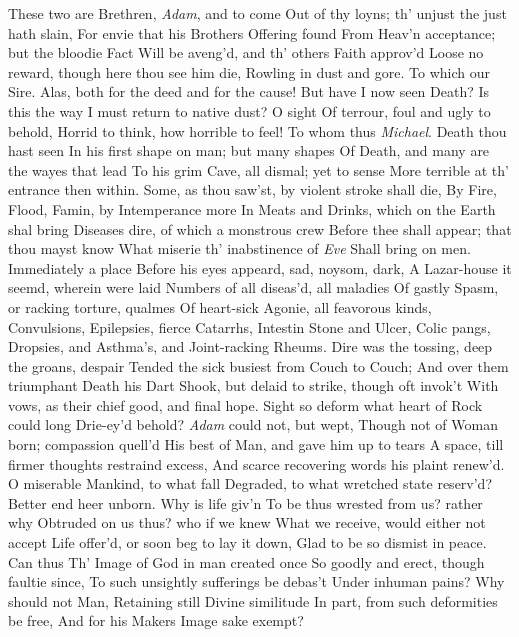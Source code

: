 \documentclass[11pt]{book}
\newcounter {first}
\begin{document}
These two are Brethren, \textit{Adam}, and to come 
Out of thy loyns; th' unjust the just hath slain, 
For envie that his Brothers Offering found 
From Heav'n acceptance; but the bloodie Fact 
Will be aveng'd, and th' others Faith approv'd 
Loose no reward, though here thou see him die, 
Rowling in dust and gore.  To which our Sire. 
\quad Alas, both for the deed and for the cause! 
But have I now seen Death?  Is this the way 
I must return to native dust?  O sight 
Of terrour, foul and ugly to behold, 
Horrid to think, how horrible to feel! 
\quad To whom thus \textit{Michael}.  Death thou hast seen 
In his first shape on man; but many shapes 
Of Death, and many are the wayes that lead 
To his grim Cave, all dismal; yet to sense 
More terrible at th' entrance then within. 
Some, as thou saw'st, by violent stroke shall die, 
By Fire, Flood, Famin, by Intemperance more 
In Meats and Drinks, which on the Earth shal bring 
Diseases dire, of which a monstrous crew 
Before thee shall appear; that thou mayst know 
What miserie th' inabstinence of \textit{Eve} 
Shall bring on men.  Immediately a place 
Before his eyes appeard, sad, noysom, dark, 
A Lazar-house it seemd, wherein were laid 
Numbers of all diseas'd, all maladies 
Of gastly Spasm, or racking torture, qualmes 
Of heart-sick Agonie, all feavorous kinds, 
Convulsions, Epilepsies, fierce Catarrhs, 
Intestin Stone and Ulcer, Colic pangs, 
Dropsies, and Asthma's, and Joint-racking Rheums. 
Dire was the tossing, deep the groans, despair 
Tended the sick busiest from Couch to Couch; 
And over them triumphant Death his Dart 
Shook, but delaid to strike, though oft invok't 
With vows, as their chief good, and final hope. 
Sight so deform what heart of Rock could long 
Drie-ey'd behold?  \textit{Adam} could not, but wept, 
Though not of Woman born; compassion quell'd 
His best of Man, and gave him up to tears 
A space, till firmer thoughts restraind excess, 
And scarce recovering words his plaint renew'd. 
\quad O miserable Mankind, to what fall 
Degraded, to what wretched state reserv'd? 
Better end heer unborn.  Why is life giv'n 
To be thus wrested from us? rather why 
Obtruded on us thus? who if we knew 
What we receive, would either not accept 
Life offer'd, or soon beg to lay it down, 
Glad to be so dismist in peace.  Can thus 
Th' Image of God in man created once 
So goodly and erect, though faultie since, 
To such unsightly sufferings be debas't 
Under inhuman pains?  Why should not Man, 
Retaining still Divine similitude 
In part, from such deformities be free, 
And for his Makers Image sake exempt? 
\end{document}

